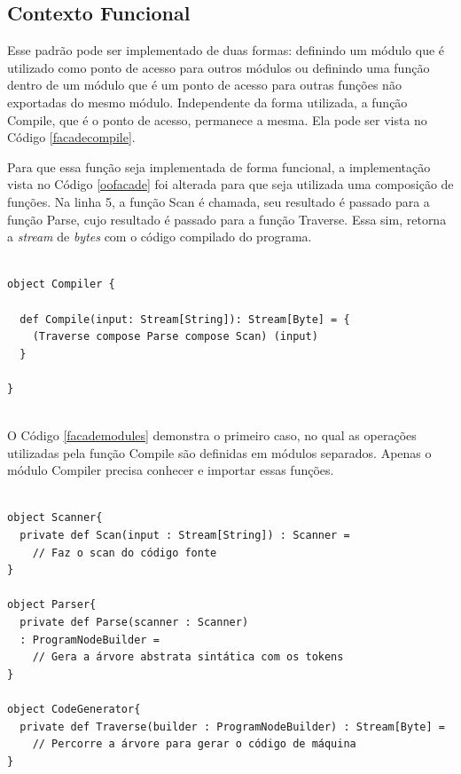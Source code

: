 \subsection*{Contexto Funcional}

Esse padrão pode ser implementado de duas formas: 
definindo um módulo que é utilizado como ponto de 
acesso para outros módulos ou definindo uma 
função dentro de um módulo que é um ponto de 
acesso para outras funções não exportadas do 
mesmo módulo. Independente da forma utilizada, 
a função Compile, que é o ponto de acesso, permanece 
a mesma. Ela pode ser vista no Código \ref{facadecompile}. 

Para que essa função seja implementada de forma 
funcional, a implementação vista no Código \ref{oofacade} 
foi alterada para que seja utilizada uma composição 
de funções. Na linha 5, a função Scan é chamada, 
seu resultado é passado para a função Parse, cujo 
resultado é passado para a função Traverse. Essa sim, 
retorna a \textit{stream} de \textit{bytes} com o 
código compilado do programa.

\begin{lstlisting}[caption={Função de acesso Compile.},label=facadecompile]
    
object Compiler {

  def Compile(input: Stream[String]): Stream[Byte] = {
    (Traverse compose Parse compose Scan) (input)
  }
  
}
    
\end{lstlisting}

O Código \ref{facademodules} demonstra o primeiro caso, 
no qual as operações utilizadas pela função Compile são 
definidas em módulos separados. Apenas o módulo 
Compiler precisa conhecer e importar essas funções.

\begin{lstlisting}[caption={Função de acesso Compile.},label=facademodules]
    
object Scanner{
  private def Scan(input : Stream[String]) : Scanner = 
    // Faz o scan do código fonte
}

object Parser{
  private def Parse(scanner : Scanner)
  : ProgramNodeBuilder = 
    // Gera a árvore abstrata sintática com os tokens
}

object CodeGenerator{
  private def Traverse(builder : ProgramNodeBuilder) : Stream[Byte] = 
    // Percorre a árvore para gerar o código de máquina
}

\end{lstlisting}

